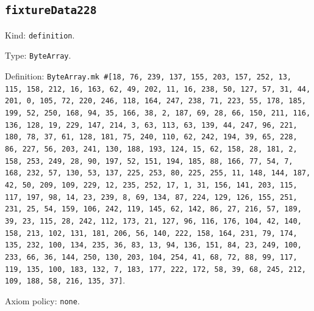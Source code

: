 \documentclass[11pt]{article}
\begin{document}
\subsection*{\texttt{fixtureData228}}
\noindent Kind: \texttt{definition}.\par
\noindent Type: \texttt{ByteArray}.\par
\noindent Definition: \texttt{ByteArray.mk \#[18, 76, 239, 137, 155, 203, 157, 252, 13, 115, 158, 212, 16, 163, 62, 49, 202, 11, 16, 238, 50, 127, 57, 31, 44, 201, 0, 105, 72, 220, 246, 118, 164, 247, 238, 71, 223, 55, 178, 185, 199, 52, 250, 168, 94, 35, 166, 38, 2, 187, 69, 28, 66, 150, 211, 116, 136, 128, 19, 229, 147, 214, 3, 63, 113, 63, 139, 44, 247, 96, 221, 180, 78, 37, 61, 128, 181, 75, 240, 110, 62, 242, 194, 39, 65, 228, 86, 227, 56, 203, 241, 130, 188, 193, 124, 15, 62, 158, 28, 181, 2, 158, 253, 249, 28, 90, 197, 52, 151, 194, 185, 88, 166, 77, 54, 7, 168, 232, 57, 130, 53, 137, 225, 253, 80, 225, 255, 11, 148, 144, 187, 42, 50, 209, 109, 229, 12, 235, 252, 17, 1, 31, 156, 141, 203, 115, 117, 197, 98, 14, 23, 239, 8, 69, 134, 87, 224, 129, 126, 155, 251, 231, 25, 54, 159, 106, 242, 119, 145, 62, 142, 86, 27, 216, 57, 189, 39, 23, 115, 28, 242, 112, 173, 21, 127, 96, 116, 176, 104, 42, 140, 158, 213, 102, 131, 181, 206, 56, 140, 222, 158, 164, 231, 79, 174, 135, 232, 100, 134, 235, 36, 83, 13, 94, 136, 151, 84, 23, 249, 100, 233, 66, 36, 144, 250, 130, 203, 104, 254, 41, 68, 72, 88, 99, 117, 119, 135, 100, 183, 132, 7, 183, 177, 222, 172, 58, 39, 68, 245, 212, 109, 188, 58, 216, 135, 37]}.\par
\noindent Axiom policy: \texttt{none}.\par
\end{document}
